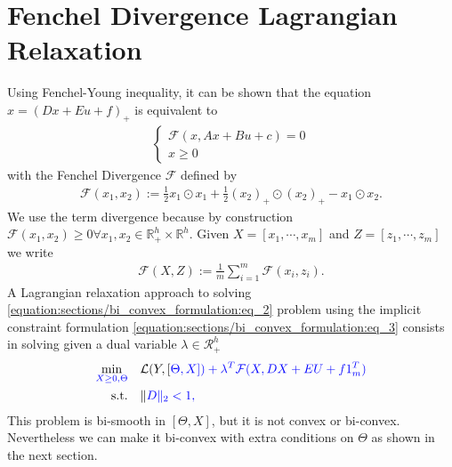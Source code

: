 \documentclass[letterpaper,10pt,english]{sphinxmanual}
\begin{document}
\section{Fenchel Divergence Lagrangian Relaxation}
\label{\detokenize{sections/bi_convex_formulation:fenchel-divergence-lagrangian-relaxation}}
Using Fenchel-Young inequality, it can be shown that the equation \(x = (Dx + Eu + f)_+\) is equivalent to
\begin{equation}\label{equation:sections/bi_convex_formulation:eq_3}
\begin{split}\begin{cases}
    \mathcal{F}(x,Ax + Bu + c) = 0 \\
    x \geq 0
\end{cases}\end{split}
\end{equation}
with the Fenchel Divergence \(\mathcal{F}\) defined by
\begin{equation*}
\begin{split}\mathcal{F}(x_1,x_2) := \frac{1}{2} x_1 \odot x_1 + \frac{1}{2} (x_2)_+ \odot (x_2)_+ - x_1 \odot x_2.\end{split}
\end{equation*}
We use the term divergence because by construction \(\mathcal{F}(x_1,x_2) \geq 0 \forall x_1,x_2 \in \mathbb{R}_+^h \times \mathbb{R}^h\).
Given \(X = [x_1, \cdots, x_m]\) and \(Z = [z_1, \cdots, z_m]\) we write
\begin{equation*}
\begin{split}\mathcal{F}(X,Z) := \frac{1}{m} \sum_{i=1}^m \mathcal{F}(x_i,z_i).\end{split}
\end{equation*}
A Lagrangian relaxation approach to solving \eqref{equation:sections/bi_convex_formulation:eq_2} problem using the implicit constraint formulation \eqref{equation:sections/bi_convex_formulation:eq_3} consists in
solving given a dual variable \(\lambda \in \mathcal{R}_+^h\)
\begin{equation}\label{equation:sections/bi_convex_formulation:eq_4}
\begin{split}\begin{align}
    \min_{\color{blue}{X} \geq 0, \color{blue}{\Theta}} \quad &\mathcal{L}(Y,[\color{blue}{\Theta},\color{blue}{X}]) + \lambda^T \mathcal{F}(\color{blue}{X},\color{blue}{DX} + \color{blue}{E}U + \color{blue}{f}1_m^T) \\
    \text{s.t.} \quad &\Vert \color{blue}{D} \Vert_2 < 1,
\end{align}\end{split}
\end{equation}
This problem is bi-smooth in \([\Theta,X]\), but it is not convex or bi-convex. Nevertheless we can make it bi-convex
with extra conditions on \(\Theta\) as shown in the next section.
\end{document}
